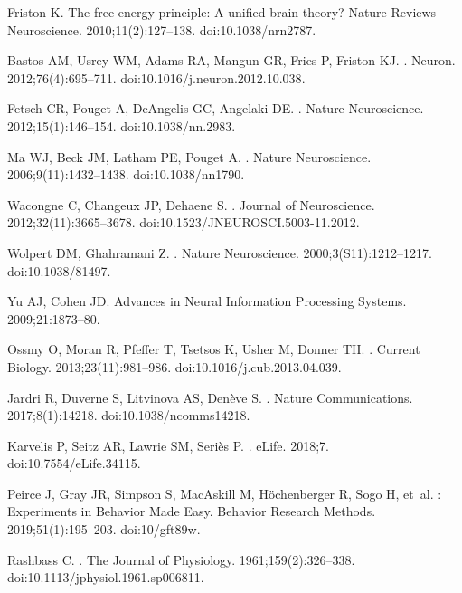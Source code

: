 \documentclass[10pt,letterpaper]{article}
\begin{document}
\begin{thebibliography}{10}
Friston K.
\newblock The free-energy principle: A unified brain theory?
\newblock Nature Reviews Neuroscience. 2010;11(2):127--138.
\newblock doi:{10.1038/nrn2787}.

Bastos AM, Usrey WM, Adams RA, Mangun GR, Fries P, Friston KJ.
.
\newblock Neuron. 2012;76(4):695--711.
\newblock doi:{10.1016/j.neuron.2012.10.038}.

Fetsch CR, Pouget A, DeAngelis GC, Angelaki DE.
.
\newblock Nature Neuroscience. 2012;15(1):146--154.
\newblock doi:{10.1038/nn.2983}.

Ma WJ, Beck JM, Latham PE, Pouget A.
.
\newblock Nature Neuroscience. 2006;9(11):1432--1438.
\newblock doi:{10.1038/nn1790}.

Wacongne C, Changeux JP, Dehaene S.
.
\newblock Journal of Neuroscience. 2012;32(11):3665--3678.
\newblock doi:{10.1523/JNEUROSCI.5003-11.2012}.

Wolpert DM, Ghahramani Z.
.
\newblock Nature Neuroscience. 2000;3(S11):1212--1217.
\newblock doi:{10.1038/81497}.

Yu AJ, Cohen JD.
\newblock Advances in Neural Information Processing Systems. 2009;21:1873--80.

Ossmy O, Moran R, Pfeffer T, Tsetsos K, Usher M, Donner TH.
.
\newblock Current Biology. 2013;23(11):981--986.
\newblock doi:{10.1016/j.cub.2013.04.039}.

Jardri R, Duverne S, Litvinova AS, Den{\`{e}}ve S.
.
\newblock Nature Communications. 2017;8(1):14218.
\newblock doi:{10.1038/ncomms14218}.

Karvelis P, Seitz AR, Lawrie SM, Seri{\`{e}}s P.
.
\newblock eLife. 2018;7.
\newblock doi:{10.7554/eLife.34115}.

Peirce J, Gray JR, Simpson S, MacAskill M, H{\"o}chenberger R, Sogo H, et~al.
: {{Experiments}} in Behavior Made Easy.
\newblock Behavior Research Methods. 2019;51(1):195--203.
\newblock doi:{10/gft89w}.

Rashbass C.
.
\newblock The Journal of Physiology. 1961;159(2):326--338.
\newblock doi:{10.1113/jphysiol.1961.sp006811}.

\end{thebibliography}
\end{document}
